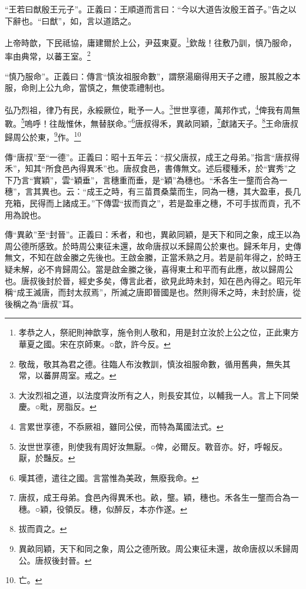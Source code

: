 {\noindent\shu{}\fzkt “王若曰猷殷王元子”。正義曰：王順道而言曰：“今以大道告汝殷王首子。”告之以下辭也。“曰猷”，如，言以道誥之。 \par}

上帝時歆，下民祗協，庸建爾於上公，尹茲東夏。\footnote{孝恭之人，祭祀則神歆享，施令則人敬和，用是封立汝於上公之位，正此東方華夏之國。宋在京師東。○歆，許今反。}欽哉！往敷乃訓，慎乃服命，率由典常，以蕃王室。\footnote{敬哉，敬其為君之德。往臨人布汝教訓，慎汝祖服命數，循用舊典，無失其常，以蕃屏周室。戒之。}

{\noindent\shu{}\fzkt “慎乃服命”。正義曰：傳言“慎汝祖服命數”，謂祭湯廟得用天子之禮，服其殷之本服，命則上公九命，當慎之，無使乖禮制也。 \par}

弘乃烈祖，律乃有民，永綏厥位，毗予一人。\footnote{大汝烈祖之道，以法度齊汝所有之人，則長安其位，以輔我一人。言上下同榮慶。○毗，房脂反。}世世享德，萬邦作式，\footnote{言累世享德，不忝厥祖，雖同公侯，而特為萬國法式。}俾我有周無斁。\footnote{汝世世享德，則使我有周好汝無厭。○俾，必爾反。斁音亦。好，呼報反。厭，於豔反。}嗚呼！往哉惟休，無替朕命。”\footnote{嘆其德，遣往之國。言當惟為美政，無廢我命。}唐叔得禾，異畝同穎，\footnote{唐叔，成王母弟。食邑內得異禾也。畝，壟。穎，穗也。禾各生一壟而合為一穗。○穎，役領反。穗，似醉反，本亦作遂。}獻諸天子。\footnote{拔而貢之。}王命唐叔歸周公於東，\footnote{異畝同穎，天下和同之象，周公之德所致。周公東征未還，故命唐叔以禾歸周公。唐叔後封晉。}作。\footnote{亡。}


{\noindent\zhuan{}\fzbyks 傳“唐叔”至“一德”。正義曰：昭十五年云：“叔父唐叔，成王之母弟。”指言“唐叔得禾”，知其“所食邑內得異禾”也。唐叔食邑，書傳無文。述后稷種禾，於“實秀”之下乃言“實穎”，雲“穎垂”，言穗重而垂，是“穎”為穗也。“禾各生一壟而合為一穗”，言其異也。云：“成王之時，有三苗貫桑葉而生，同為一穗，其大盈車，長几充箱，民得而上諸成王。”下傳雲“拔而貢之”，若是盈車之穗，不可手拔而貢，孔不用為說也。 \par}

{\noindent\zhuan{}\fzbyks 傳“異畝”至“封晉”。正義曰：禾者，和也，異畝同穎，是天下和同之象，成王以為周公德所感致。於時周公東征未還，故命唐叔以禾歸周公於東也。歸禾年月，史傳無文，不知在啟金縢之先後也。王啟金縢，正當禾熟之月。若是前年得之，於時王疑未解，必不肯歸周公。當是啟金縢之後，喜得東土和平而有此應，故以歸周公也。唐叔後封於晉，經史多矣，傳言此者，欲見此時未封，知在邑內得之。昭元年稱“成王滅唐，而封太叔焉”，所滅之唐即晉國是也。然則得禾之時，未封於唐，從後稱之為“唐叔”耳。 \par}

